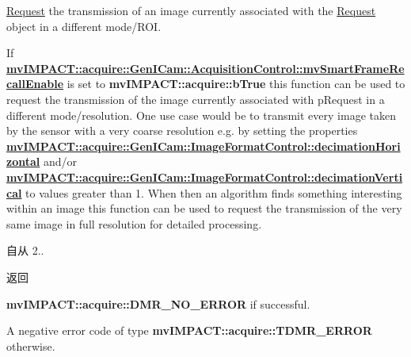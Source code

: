 \hyperlink{classmv_i_m_p_a_c_t_1_1acquire_1_1_request}{Request} the transmission of an image currently associated with the \hyperlink{classmv_i_m_p_a_c_t_1_1acquire_1_1_request}{Request} object in a different mode/\+R\+O\+I. 

If {\bfseries \hyperlink{classmv_i_m_p_a_c_t_1_1acquire_1_1_gen_i_cam_1_1_acquisition_control_aeb86056e3eb76d5c80c4048ac9ba10d5}{mv\+I\+M\+P\+A\+C\+T\+::acquire\+::\+Gen\+I\+Cam\+::\+Acquisition\+Control\+::mv\+Smart\+Frame\+Recall\+Enable}} is set to {\bfseries mv\+I\+M\+P\+A\+C\+T\+::acquire\+::b\+True} this function can be used to request the transmission of the image currently associated with {\ttfamily p\+Request} in a different mode/resolution. One use case would be to transmit every image taken by the sensor with a very coarse resolution e.\+g. by setting the properties {\bfseries \hyperlink{classmv_i_m_p_a_c_t_1_1acquire_1_1_gen_i_cam_1_1_image_format_control_af3c2ae5e5f9aaea7a762f3cd10ce1ebb}{mv\+I\+M\+P\+A\+C\+T\+::acquire\+::\+Gen\+I\+Cam\+::\+Image\+Format\+Control\+::decimation\+Horizontal}} and/or {\bfseries \hyperlink{classmv_i_m_p_a_c_t_1_1acquire_1_1_gen_i_cam_1_1_image_format_control_aee18567f6502e019607cab86903a68af}{mv\+I\+M\+P\+A\+C\+T\+::acquire\+::\+Gen\+I\+Cam\+::\+Image\+Format\+Control\+::decimation\+Vertical}} to values greater than 1. When then an algorithm finds something interesting within an image this function can be used to request the transmission of the very same image in full resolution for detailed processing.

\begin{DoxySince}{自从}
2.. 
\end{DoxySince}
\begin{DoxyReturn}{返回}

\begin{DoxyItemize}
\item {\bfseries mv\+I\+M\+P\+A\+C\+T\+::acquire\+::\+D\+M\+R\+\_\+\+N\+O\+\_\+\+E\+R\+R\+O\+R} if successful.
\item A negative error code of type {\bfseries mv\+I\+M\+P\+A\+C\+T\+::acquire\+::\+T\+D\+M\+R\+\_\+\+E\+R\+R\+O\+R} otherwise. 
\end{DoxyItemize}
\end{DoxyReturn}

